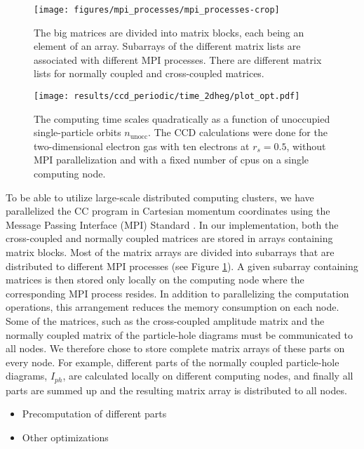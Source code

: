 \documentclass[a4paper,12pt]{report}
\begin{document}
\begin{figure} 
  \centering
  \texttt{[image: figures/mpi\_processes/mpi\_processes-crop]}
  \caption{The big matrices are divided into matrix blocks, 
    each being an element of an array. 
    Subarrays of the different matrix lists are associated 
    with different MPI processes. There are different matrix 
    lists for normally coupled and cross-coupled matrices.}
  \label{fig:mpi_processes}
\end{figure}

\begin{figure} 
  \centering
  \texttt{[image: results/ccd\_periodic/time\_2dheg/plot\_opt.pdf]}
  \caption{The computing time scales quadratically as a function
    of unoccupied single-particle orbits $n_{\mathrm{unocc}}$.
    The CCD calculations were done for the two-dimensional 
    electron gas with ten electrons at $r_{s} = 0.5$,
    without MPI parallelization and with a fixed number of cpus
    on a single computing node.}
  \label{fig:time_scaling}
\end{figure}


To be able to utilize large-scale distributed computing 
clusters, we have parallelized the CC program in Cartesian
momentum coordinates using the Message Passing Interface
(MPI) Standard \cite{gropp1999,traff2012}. In our 
implementation, both the cross-coupled and normally
coupled matrices are stored in arrays containing matrix
blocks. Most of the matrix arrays are divided into 
subarrays that are distributed to different MPI processes 
(see Figure \ref{fig:mpi_processes}). 
A given subarray containing matrices is then stored 
only locally on the computing node where the corresponding
MPI process resides. In addition to parallelizing the 
computation operations, this arrangement reduces the memory
consumption on each node. Some of the matrices, such as the
cross-coupled amplitude matrix and the normally coupled 
matrix of the particle-hole diagrams must be communicated
to all nodes. We therefore chose to store complete matrix
arrays of these parts on every node. For example, different
parts of the normally coupled particle-hole diagrams, 
$I_{ph}$, are calculated locally on different computing 
nodes, and finally all parts are summed up and the resulting 
matrix array is distributed to all nodes. 


\begin{itemize}
\item Precomputation of different parts
\item Other optimizations
\end{itemize}
\end{document}
